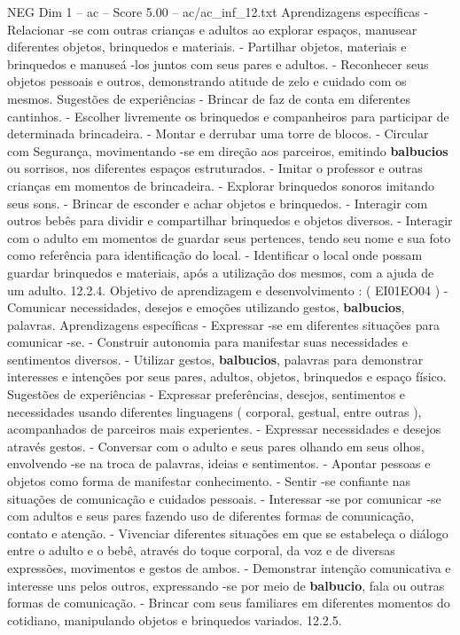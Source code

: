 \begin{textsample}{NEG Dim 1 – ac – Score 5.00 – ac/ac\_inf\_12.txt}
Aprendizagens específicas - Relacionar -se com outras crianças e adultos ao explorar espaços, manusear diferentes objetos, brinquedos e materiais. - Partilhar objetos, materiais e brinquedos e manuseá -los juntos com seus pares e adultos. - Reconhecer seus objetos pessoais e outros, demonstrando atitude de zelo e cuidado com os mesmos.
Sugestões de experiências - Brincar de faz de conta em diferentes cantinhos. - Escolher livremente os brinquedos e companheiros para participar de determinada brincadeira. - Montar e derrubar uma torre de blocos. - Circular com Segurança, movimentando -se em direção aos parceiros, emitindo \textbf{balbucios} ou sorrisos, nos diferentes espaços estruturados. - Imitar o professor e outras crianças em momentos de brincadeira. - Explorar brinquedos sonoros imitando seus sons. - Brincar de esconder e achar objetos e brinquedos. - Interagir com outros bebês para dividir e compartilhar brinquedos e objetos diversos. - Interagir com o adulto em momentos de guardar seus pertences, tendo seu nome e sua foto como referência para identificação do local. - Identificar o local onde possam guardar brinquedos e materiais, após a utilização dos mesmos, com a ajuda de um adulto. 12.2.4.
Objetivo de aprendizagem e desenvolvimento : ( EI01EO04 ) - Comunicar necessidades, desejos e emoções utilizando gestos, \textbf{balbucios}, palavras.
Aprendizagens específicas - Expressar -se em diferentes situações para comunicar -se. - Construir autonomia para manifestar suas necessidades e sentimentos diversos. - Utilizar gestos, \textbf{balbucios}, palavras para demonstrar interesses e intenções por seus pares, adultos, objetos, brinquedos e espaço físico.
Sugestões de experiências - Expressar preferências, desejos, sentimentos e necessidades usando diferentes linguagens ( corporal, gestual, entre outras ), acompanhados de parceiros mais experientes. - Expressar necessidades e desejos através gestos. - Conversar com o adulto e seus pares olhando em seus olhos, envolvendo -se na troca de palavras, ideias e sentimentos. - Apontar pessoas e objetos como forma de manifestar conhecimento. - Sentir -se confiante nas situações de comunicação e cuidados pessoais. - Interessar -se por comunicar -se com adultos e seus pares fazendo uso de diferentes formas de comunicação, contato e atenção. - Vivenciar diferentes situações em que se estabeleça o diálogo entre o adulto e o bebê, através do toque corporal, da voz e de diversas expressões, movimentos e gestos de ambos. - Demonstrar intenção comunicativa e interesse uns pelos outros, expressando -se por meio de \textbf{balbucio}, fala ou outras formas de comunicação. - Brincar com seus familiares em diferentes momentos do cotidiano, manipulando objetos e brinquedos variados. 12.2.5.

\end{textsample}
